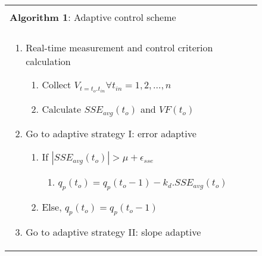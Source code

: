 \documentclass[journal]{IEEEtran}
\begin{document}
\begin{figure}[]
\vspace{-2mm}
\small
{}
\renewcommand\labelenumi{\theenumi.}
\renewcommand\labelenumii{\theenumi.\arabic{enumii}.}
\renewcommand\labelenumiii{}
\begin{tabular}{p{}}
\hline\\[-1.5ex]
\textbf{Algorithm 1}: Adaptive control scheme\\
\hline\\\vspace{-1.5em}
\begin{enumerate}
\item Real-time measurement and control criterion calculation
	\begin{enumerate}
	\item Collect $V_{t=t_o.t_{in}} \forall 			t_{in}=1,2,\dots,n$
	\item Calculate $SSE_{avg}(t_o)$ and $VF(t_o)$
	\end{enumerate}
\item Go to adaptive strategy I: error adaptive   
	\begin{enumerate}
	\item 	If $|SSE_{avg}(t_o)|>\mu+\epsilon_{sse}$
    	\begin{enumerate}
    	\item $q_p(t_o)=q_p(t_o-1)-k_d.SSE_{avg}(t_o)$
	  	\end{enumerate}
	\item Else, $q_p (t_o )=q_p (t_o-1)$
    \end{enumerate}    
\item Go to adaptive strategy II: slope adaptive


\end{enumerate}
\end{tabular}
\end{figure}
\end{document}
